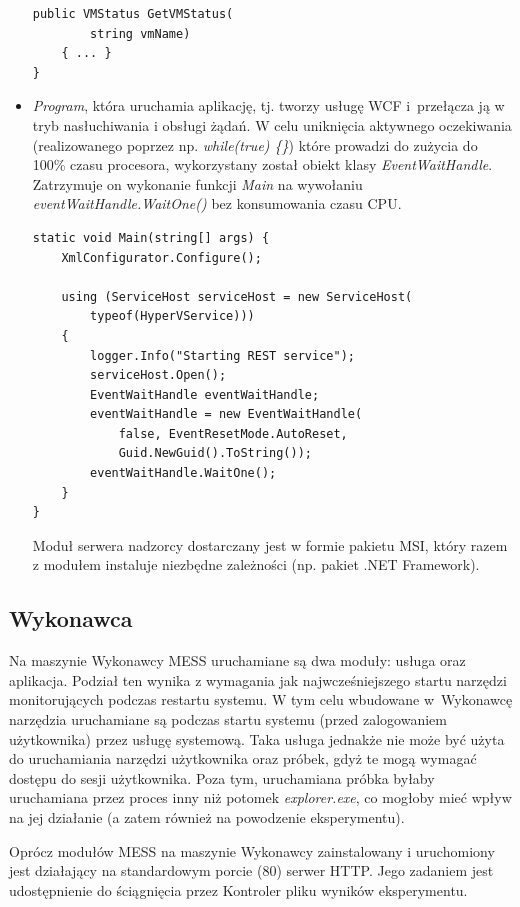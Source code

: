 \documentclass[a4paper,12pt,oneside]{article}
\begin{document}
\begin{itemize}
\begin{lstlisting}[language={[Sharp]C}]
    public VMStatus GetVMStatus(
    	string vmName)
    { ... }
}\end{lstlisting}

		\item \textit{Program}, która uruchamia aplikację, tj. tworzy usługę WCF i~przełącza ją w tryb nasłuchiwania i obsługi żądań. W celu uniknięcia aktywnego oczekiwania (realizowanego poprzez np. \textit{while(true) \{\}}) które prowadzi do zużycia do 100\% czasu procesora, wykorzystany został obiekt klasy \textit{EventWaitHandle}. Zatrzymuje on wykonanie funkcji \textit{Main} na wywołaniu \textit{eventWaitHandle.WaitOne()} bez konsumowania czasu CPU.
		
		\begin{lstlisting}[language={[Sharp]C}]
static void Main(string[] args) {
    XmlConfigurator.Configure();

    using (ServiceHost serviceHost = new ServiceHost(
    	typeof(HyperVService))) 
    {                
        logger.Info("Starting REST service");
        serviceHost.Open();
        EventWaitHandle eventWaitHandle;        
        eventWaitHandle = new EventWaitHandle(
        	false, EventResetMode.AutoReset, 
        	Guid.NewGuid().ToString());        	
        eventWaitHandle.WaitOne();
    }    
}
		\end{lstlisting}
		
		Moduł serwera nadzorcy dostarczany jest w formie pakietu MSI, który razem z modułem instaluje niezbędne zależności (np. pakiet .NET Framework).
	\end{itemize}
		
	
	\subsection{Wykonawca}		
	
	Na maszynie Wykonawcy MESS uruchamiane są dwa moduły: usługa oraz aplikacja. Podział ten wynika z wymagania jak najwcześniejszego startu narzędzi monitorujących podczas restartu systemu. W tym celu wbudowane w~Wykonawcę narzędzia uruchamiane są podczas startu systemu (przed zalogowaniem użytkownika) przez usługę systemową. Taka usługa jednakże nie może być użyta do uruchamiania narzędzi użytkownika oraz próbek, gdyż te mogą wymagać dostępu do sesji użytkownika. Poza tym, uruchamiana próbka byłaby uruchamiana przez proces inny niż potomek \textit{explorer.exe}, co mogłoby mieć wpływ na jej działanie (a zatem również na powodzenie eksperymentu).
	
	Oprócz modułów MESS na maszynie Wykonawcy zainstalowany i uruchomiony jest działający na standardowym porcie (80) serwer HTTP. Jego zadaniem jest udostępnienie do ściągnięcia przez Kontroler pliku wyników eksperymentu.
	
\end{document}

